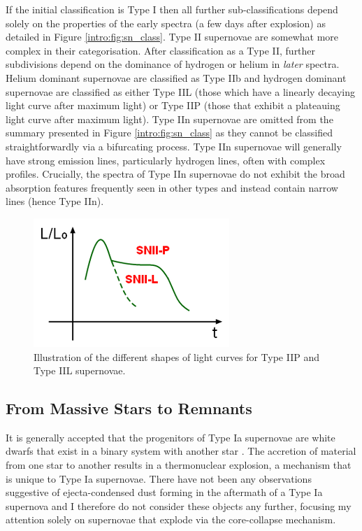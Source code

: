 If the initial classification is Type I then all further sub-classifications depend solely on the properties of the early spectra (a few days after explosion) as detailed in Figure \ref{intro:fig:sn_class}.  Type II supernovae are somewhat more complex in their categorisation.  After classification as a Type II, further subdivisions depend on the dominance of hydrogen or helium in \textit{later} spectra.  Helium dominant supernovae are classified as Type IIb and hydrogen dominant supernovae are classified as either Type IIL (those which have a linearly decaying light curve after maximum light) or Type IIP (those that exhibit a plateauing light curve after maximum light).  Type IIn supernovae are omitted from the summary presented in Figure \ref{intro:fig:sn_class} as they cannot be classified straightforwardly via a bifurcating process.  Type IIn supernovae will generally have strong emission lines, particularly hydrogen lines, often with complex profiles.  Crucially, the spectra of Type IIn supernovae do not exhibit the broad absorption features frequently seen in other types and instead contain narrow lines (hence Type IIn).  

\begin{figure}
\centering
\includegraphics[clip=true, scale = 1, trim=0 0 0 0]{chapters/chapter1/figs/light_curves.png}
\caption{Illustration of the different shapes of light curves for Type IIP and Type IIL supernovae.}
\label{fig:light_curves}
\end{figure}

\subsection{From Massive Stars to Remnants}

It is generally accepted that the progenitors of Type Ia supernovae are white dwarfs that exist in a binary system with another star \citep{Wang2012}.  The accretion of material from one star to another results in a thermonuclear explosion, a mechanism that is unique to Type Ia supernovae.  There have not been any observations suggestive of ejecta-condensed dust forming in the aftermath of a Type Ia supernova and I therefore do not consider these objects any further, focusing my attention solely on supernovae that explode via the core-collapse mechanism.  

